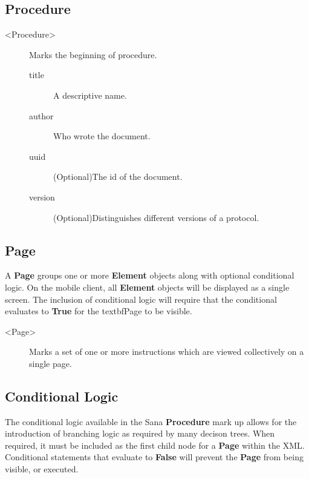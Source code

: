 \documentclass[a4paper,10pt]{article}
\begin{document}
\subsection{Procedure}
\begin{description}
 \item [\textless Procedure\textgreater] Marks the beginning of procedure.
  \begin{description}
   \item[title] A descriptive name.
   \item[author] Who wrote the document.
   \item[uuid] (Optional)The id of the document.
   \item[version] (Optional)Distinguishes different versions of a protocol.
  \end{description}
\end{description}

\subsection{Page}
A \textbf{Page} groups one or more \textbf{Element} objects along with optional
conditional logic. On the mobile client, all \textbf{Element} objects will be
displayed as a single screen. The inclusion of conditional logic will require
that the conditional evaluates to \textbf{True} for the textbf{Page} to be 
visible.

\begin{description}
 \item [\textless Page\textgreater] Marks a set of one or more instructions 
 which are viewed collectively on a single page.
\end{description}

\subsection{Conditional Logic} 
The conditional logic available in the Sana \textbf{Procedure} mark up allows
for the introduction of branching logic as required by many decison trees. When
required, it must be included as the first child node for a \textbf{Page} within
the XML. Conditional statements that evaluate to \textbf{False} will prevent
the \textbf{Page} from being visible, or executed.
\end{document}
